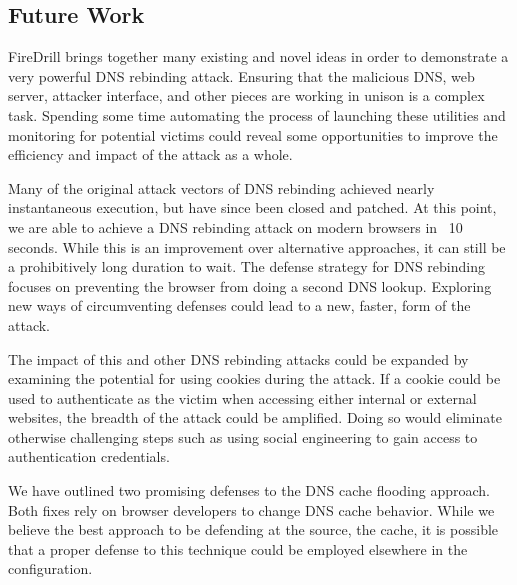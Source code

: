 \subsection{Future Work}

FireDrill brings together many existing and novel ideas in order to demonstrate a very powerful DNS rebinding attack. Ensuring that the malicious DNS, web server, attacker interface, and other pieces are working in unison is a complex task. Spending some time automating the process of launching these utilities and monitoring for potential victims could reveal some opportunities to improve the efficiency and impact of the attack as a whole.

Many of the original attack vectors of DNS rebinding achieved nearly instantaneous execution, but have since been closed and patched. At this point, we are able to achieve a DNS rebinding attack on modern browsers in ~10 seconds. While this is an improvement over alternative approaches, it can still be a prohibitively long duration to wait.  The defense strategy for DNS rebinding focuses on preventing the browser from doing a second DNS lookup. Exploring new ways of circumventing defenses could lead to a new, faster, form of the attack.

The impact of this and other DNS rebinding attacks could be expanded by examining the potential for using cookies during the attack. If a cookie could be used to authenticate as the victim when accessing either internal or external websites, the breadth of the attack could be amplified. Doing so would eliminate otherwise challenging steps such as using social engineering to gain access to authentication credentials.

We have outlined two promising defenses to the DNS cache flooding approach. Both fixes rely on browser developers to change DNS cache behavior. While we believe the best approach to be defending at the source, the cache, it is possible that a proper defense to this technique could be employed elsewhere in the configuration.




